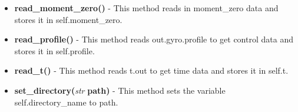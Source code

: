 \documentclass{article}
\begin{document}
\begin{itemize}
\begin{itemize}
\item \textbf{read\_moment\_zero()} - This method reads in moment\_zero data and stores it in self.moment\_zero.
\item \textbf{read\_profile()} - This method reads out.gyro.profile to get control data and stores it in self.profile.
\item \textbf{read\_t()} - This method reads t.out to get time data and stores it in self.t.
\item \textbf{set\_directory(}\emph{str}\textbf{ path)} - This method sets the variable self.directory\_name to path.
\end{itemize}
\end{itemize}
\end{document}
